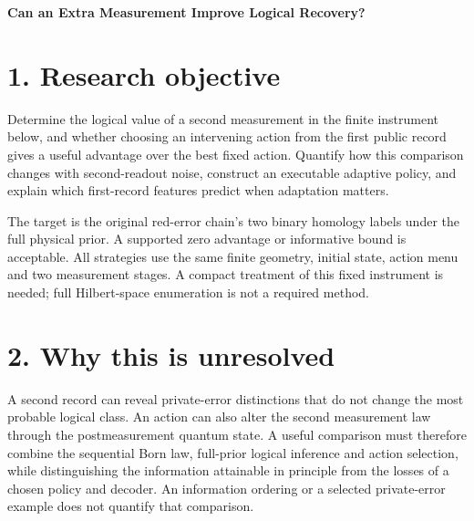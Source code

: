 \documentclass[11pt,letterpaper]{article}
\begin{document}
\fontsize{10.5}{12.7}\selectfont
{\raggedright{}\fontsize{24}{28}\selectfont\sffamily\bfseries Can an Extra Measurement Improve Logical Recovery?\par}


\vspace{8pt}

\section*{1. Research objective}

Determine the logical value of a second measurement in the finite instrument below, and whether choosing an intervening action from the first public record gives a useful advantage over the best fixed action. Quantify how this comparison changes with second-readout noise, construct an executable adaptive policy, and explain which first-record features predict when adaptation matters.\par

The target is the original red-error chain's two binary homology labels under the full physical prior. A supported zero advantage or informative bound is acceptable. All strategies use the same finite geometry, initial state, action menu and two measurement stages. A compact treatment of this fixed instrument is needed; full Hilbert-space enumeration is not a required method.\par

\section*{2. Why this is unresolved}

A second record can reveal private-error distinctions that do not change the most probable logical class. An action can also alter the second measurement law through the postmeasurement quantum state. A useful comparison must therefore combine the sequential Born law, full-prior logical inference and action selection, while distinguishing the information attainable in principle from the losses of a chosen policy and decoder. An information ordering or a selected private-error example does not quantify that comparison.\par
\end{document}
